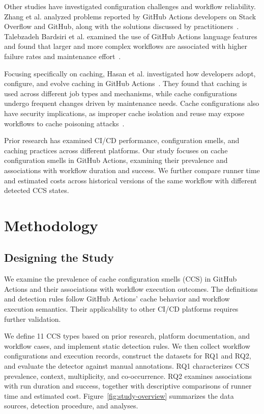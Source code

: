 \documentclass[smallextended]{svjour3}
\begin{document}
Other studies have investigated configuration challenges and workflow reliability. Zhang et al. analyzed problems reported by GitHub Actions developers on Stack Overflow and GitHub, along with the solutions discussed by practitioners~\citep{zhang2024ghaproblems}. Talebzadeh Bardsiri et al. examined the use of GitHub Actions language features and found that larger and more complex workflows are associated with higher failure rates and maintenance effort~\citep{bardsiri2026ghalanguage}.

Focusing specifically on caching, Hasan et al. investigated how developers adopt, configure, and evolve caching in GitHub Actions~\citep{hasan2026caching}. They found that caching is used across different job types and mechanisms, while cache configurations undergo frequent changes driven by maintenance needs. Cache configurations also have security implications, as improper cache isolation and reuse may expose workflows to cache poisoning attacks~\citep{cache_security_sp2024}.

Prior research has examined CI/CD performance, configuration smells, and caching practices across different platforms. Our study focuses on cache configuration smells in GitHub Actions, examining their prevalence and associations with workflow duration and success. We further compare runner time and estimated costs across historical versions of the same workflow with different detected CCS states.

\section{Methodology}
\label{sec:methodology}

\subsection{Designing the Study}

We examine the prevalence of cache configuration smells (CCS) in GitHub Actions and their associations with workflow execution outcomes. The definitions and detection rules follow GitHub Actions' cache behavior and workflow execution semantics. Their applicability to other CI/CD platforms requires further validation.

We define 11 CCS types based on prior research, platform documentation, and workflow cases, and implement static detection rules. We then collect workflow configurations and execution records, construct the datasets for RQ1 and RQ2, and evaluate the detector against manual annotations. RQ1 characterizes CCS prevalence, context, multiplicity, and co-occurrence. RQ2 examines associations with run duration and success, together with descriptive comparisons of runner time and estimated cost. Figure~\ref{fig:study-overview} summarizes the data sources, detection procedure, and analyses.
\end{document}

